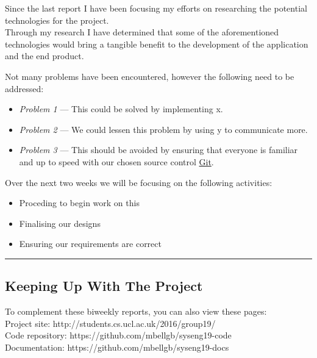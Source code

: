 \documentclass[11pt]{report}
\begin{document}
\pagebreak
\bigskip
{}
\smallskip

\noindent
Since the last report I have been focusing my efforts on researching the potential technologies for the project. \\

\noindent
Through my research I have determined that some of the aforementioned technologies would bring a tangible benefit to the development of the application and the end product. \\

\bigskip
{}
\smallskip

\noindent
Not many problems have been encountered, however the following need to be addressed:

\begin{itemize}
  \item {\it Problem 1\/} --- This could be solved by implementing x.
  \item {\it Problem 2\/} --- We could lessen this problem by using y to communicate more.
  \item {\it Problem 3\/} --- This should be avoided by ensuring that everyone is familiar and up to speed with our chosen source control \href{http://git-scm.com}{Git}.
\end{itemize}

\bigskip
{}
\smallskip

\noindent
Over the next two weeks we will be focusing on the following activities:

\begin{itemize}
  \item Proceding to begin work on this
  \item Finalising our designs
  \item Ensuring our requirements are correct
\end{itemize}

\hrule

\subsection*{Keeping Up With The Project}

To complement these biweekly reports, you can also view these pages:\\

\noindent
Project site: http://students.cs.ucl.ac.uk/2016/group19/\\

\noindent
Code repository: https://github.com/mbellgb/syseng19-code\\

\noindent
Documentation: https://github.com/mbellgb/syseng19-docs
\end{document}
